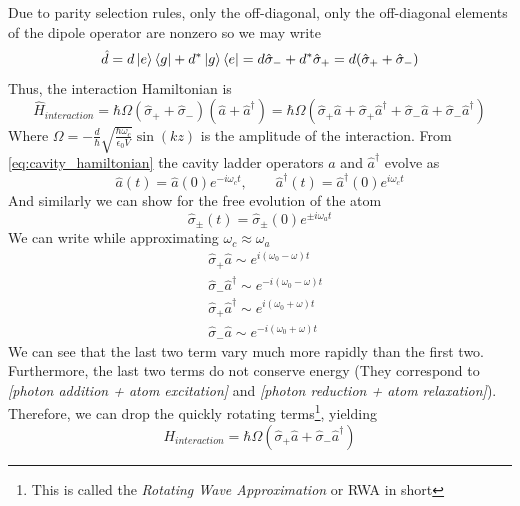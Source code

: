 Due to parity selection rules, only the off-diagonal, only the off-diagonal elements of the dipole operator are nonzero so we may write
\[
    \hat{d} = d\ket{e}\bra{g} + d^* \ket{g}\bra{e} = d\hat{\sigma}_- + d^* \hat{\sigma}_+ = d (\hat{\sigma}_+ + \hat{\sigma}_-)
\]
Thus, the interaction Hamiltonian is
\begin{equation}
    \hat{H}_{interaction} = \hbar\Omega (\hat{\sigma}_+ + \hat{\sigma}_-) (\hat{a} +  \hat{a}^\dag) 
    = \hbar\Omega (\hat{\sigma}_+\hat{a} + \hat{\sigma}_+\hat{a}^\dag + \hat{\sigma}_-\hat{a} + \hat{\sigma}_-\hat{a}^\dag) 
\end{equation} \label{eq:interaction-hamiltonian}
Where $\Omega = -\frac{d}{\hbar}\sqrt{\frac{\hbar \omega_c}{\epsilon_0 V}} \sin (kz)$ is the amplitude of the interaction.
From \ref{eq:cavity_hamiltonian} the cavity ladder operators $\hat{a}$ and $\hat{a}^\dag$ evolve as
\begin{equation}
    \hat{a} (t) = \hat{a} (0)e^{-i\omega_c t}, \quad\quad \hat{a}^\dag{} (t) = \hat{a}^\dag{} (0)e^{i\omega_c t}
\end{equation}
And similarly we can show for the free evolution of the atom
\begin{equation}
    \hat{\sigma}_{\pm} (t) =   \hat{\sigma}_{\pm} (0)e^{\pm i\omega_a t}
\end{equation}
We can write while approximating $\omega_c \approx \omega_a$
\begin{equation}
    \begin{split}
        &\hat{\sigma}_+\hat{a} \sim e^{i (\omega_0 - \omega)t}\\
        &\hat{\sigma}_-\hat{a}^\dag \sim e^{-i (\omega_0 - \omega)t}\\
        &\hat{\sigma}_+\hat{a}^\dag \sim e^{i (\omega_0 + \omega)t}\\
        &\hat{\sigma}_-\hat{a} \sim e^{-i (\omega_0 + \omega)t}
    \end{split}
\end{equation}
We can see that the last two term vary much more rapidly than the first two. Furthermore, the last two terms do not conserve energy (They correspond to \textit{[photon addition + atom excitation]} and \textit{[photon reduction + atom relaxation]}). Therefore, we can drop the quickly rotating terms\footnote{This is called the \textit{Rotating Wave Approximation} or RWA in short}, yielding
\begin{equation} \label{eq:interaction-hamiltonian-RWA}
    \boxed{H_{interaction} = \hbar\Omega (\hat{\sigma}_+\hat{a} + \hat{\sigma}_-\hat{a}^\dag)}
\end{equation}

